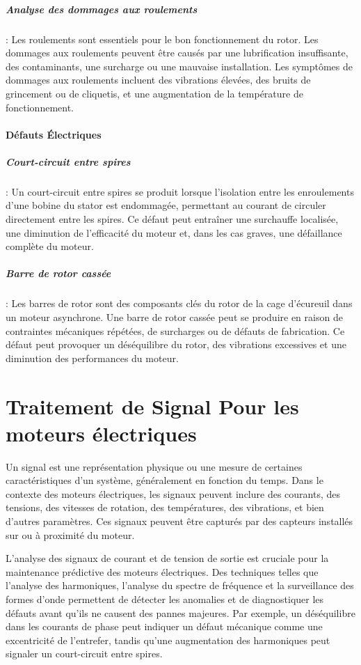\subparagraph{Analyse des dommages aux roulements}:
Les roulements sont essentiels pour le bon fonctionnement du rotor. Les
dommages aux roulements peuvent être causés par une lubrification insuffisante,
des contaminants, une surcharge ou une mauvaise installation. Les symptômes de
dommages aux roulements incluent des vibrations élevées, des bruits de
grincement ou de cliquetis, et une augmentation de la température de
fonctionnement.

\paragraph{Défauts Électriques}

\subparagraph{Court-circuit entre spires}:
Un court-circuit entre spires se produit lorsque l'isolation entre les
enroulements d'une bobine du stator est endommagée, permettant au courant de
circuler directement entre les spires. Ce défaut peut entraîner une surchauffe
localisée, une diminution de l'efficacité du moteur et, dans les cas graves,
une défaillance complète du moteur.

\subparagraph{Barre de rotor cassée}:
Les barres de rotor sont des composants clés du rotor de la cage d'écureuil
dans un moteur asynchrone. Une barre de rotor cassée peut se produire en raison
de contraintes mécaniques répétées, de surcharges ou de défauts de fabrication.
Ce défaut peut provoquer un déséquilibre du rotor, des vibrations excessives et
une diminution des performances du moteur.


\section{Traitement de Signal Pour les moteurs électriques}

Un signal est une représentation physique ou une mesure de certaines
caractéristiques d’un système, généralement en fonction du temps. Dans le
contexte des moteurs électriques, les signaux peuvent inclure des courants, des
tensions, des vitesses de rotation, des températures, des vibrations, et bien
d'autres paramètres. Ces signaux peuvent être capturés par des capteurs
installés sur ou à proximité du moteur.

L'analyse des signaux de courant et de tension de sortie est cruciale pour la
maintenance prédictive des moteurs électriques. Des techniques telles que
l'analyse des harmoniques, l'analyse du spectre de fréquence et la surveillance
des formes d'onde permettent de détecter les anomalies et de diagnostiquer les
défauts avant qu'ils ne causent des pannes majeures. Par exemple, un
déséquilibre dans les courants de phase peut indiquer un défaut mécanique comme
une excentricité de l'entrefer, tandis qu'une augmentation des harmoniques peut
signaler un court-circuit entre spires.

